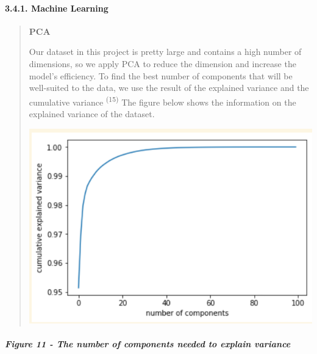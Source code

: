 \documentclass[
]{article}
\begin{document}
\hypertarget{machine-learning-1}{%
\paragraph{\texorpdfstring{\textbf{3.4.1. Machine
Learning}}{3.4.1. Machine Learning}}\label{machine-learning-1}}

\begin{quote}
\textbf{PCA}

Our dataset in this project is pretty large and contains a high number
of dimensions, so we apply PCA to reduce the dimension and increase the
model's efficiency. To find the best number of components that will be
well-suited to the data, we use the result of the explained variance and
the cumulative variance \textsuperscript{(15)} The figure below shows
the information on the explained variance of the dataset.

\includegraphics[width=4.85941in,height=3.32977in]{vertopal_f239f640fefe43bb8bc0698cafd57825/media/image2.png}
\end{quote}

\hypertarget{figure-11---the-number-of-components-needed-to-explain-variance}{%
\subparagraph{\texorpdfstring{\textbf{Figure 11} - The number of
components needed to explain
variance}{Figure 11 - The number of components needed to explain variance}}\label{figure-11---the-number-of-components-needed-to-explain-variance}}
\end{document}
